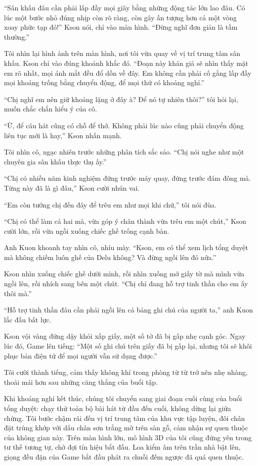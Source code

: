 ﻿\documentclass[../main.tex]{subfiles}
\begin{document}
``Sân khấu đâu cần phải lấp đầy mọi giây bằng những động tác lớn lao đâu. Có lúc một bước nhỏ đúng nhịp còn rõ ràng, còn gây ấn tượng hơn cả một vòng xoay phức tạp đó!'' Kson nói, chỉ vào màn hình. ``Đừng nghĩ đơn giản là tầm thường.''

Tôi nhìn lại hình ảnh trên màn hình, nơi tôi vừa quay về vị trí trung tâm sân khấu. Kson chỉ vào đúng khoảnh khắc đó. ``Đoạn này khán giả sẽ nhìn thấy mặt em rõ nhất, mọi ánh mắt đều đổ dồn về đây. Em không cần phải cố gắng lấp đầy mọi khoảng trống bằng chuyển động, để mọi thứ có khoảng nghỉ.''

``Chị nghĩ em nên giữ khoảng lặng ở đây à? Để nó tự nhiên thôi?'' tôi hỏi lại, muốn chắc chắn hiểu ý của cô.

``Ừ, để câu hát cũng có chỗ để thở. Không phải lúc nào cũng phải chuyển động liên tục mới là hay,'' Kson nhấn mạnh.

Tôi nhìn cô, ngạc nhiên trước những phân tích sắc sảo. ``Chị nói nghe như một chuyên gia sân khấu thực thụ ấy.''

``Chị có nhiều năm kinh nghiệm đứng trước máy quay, đứng trước đám đông mà. Từng này đã là gì đâu,'' Kson cười nhún vai.

``Em còn tưởng chị đến đây để trêu em như mọi khi chứ,'' tôi nói đùa.

``Chị có thể làm cả hai mà, vừa góp ý chân thành vừa trêu em một chút,'' Kson cười lớn, rồi vừa ngồi xuống chiếc ghế trống cạnh bàn.

Anh Kuon khoanh tay nhìn cô, nhíu mày. ``Kson, em có thể xem lịch tổng duyệt mà không chiếm luôn ghế của Delu không? Và đừng ngồi lên đó nữa.''

Kson nhìn xuống chiếc ghế dưới mình, rồi nhìn xuống mớ giấy tờ mà mình vừa ngồi lên, rồi nhích sang bên một chút. ``Chị chỉ đang hỗ trợ tinh thần cho em ấy thôi mà.''

``Hỗ trợ tinh thần đâu cần phải ngồi lên cả bảng ghi chú của người ta,'' anh Kuon lắc đầu bất lực.

Kson vội vàng đứng dậy khỏi xấp giấy, một số tờ đã bị gấp nhẹ cạnh góc. Ngay lúc đó, Game lên tiếng: ``Một số ghi chú trên giấy đã bị gấp lại, nhưng tôi sẽ khôi phục bản điện tử để mọi người vẫn sử dụng được.''

Tôi cười thành tiếng, cảm thấy không khí trong phòng từ từ trở nên nhẹ nhàng, thoải mái hơn sau những căng thẳng của buổi tập.

\ct

Khi khoảng nghỉ kết thúc, chúng tôi chuyển sang giai đoạn cuối cùng của buổi tổng duyệt: chạy thử toàn bộ bài hát từ đầu đến cuối, không dừng lại giữa chừng. Tôi bước chậm rãi đến vị trí trung tâm của khu vực tập luyện, đôi chân đặt trùng khớp với dấu chân sơn trắng mờ trên sàn gỗ, cảm nhận sự quen thuộc của không gian này. Trên màn hình lớn, mô hình 3D của tôi cũng đứng yên trong tư thế tương tự, chờ đợi tín hiệu bắt đầu. Loa kiểm âm trên trần nhà bật lên, giọng đều đặn của Game bắt đầu phát ra chuỗi đếm ngược đã quá quen thuộc.
\end{document}
